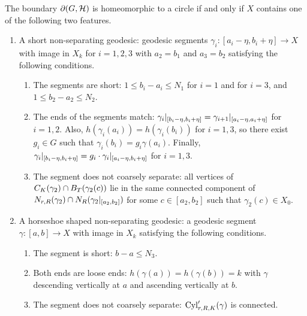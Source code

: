 \begin{theorem}\label{theorem:circular_boundary_feature} 
  The boundary $\partial (G,\mathcal{H})$ is homeomorphic to a circle if and only if $X$ contains one of the following two features.
\begin{enumerate}
  \item 
    A short non-separating geodesic: geodesic segments $\gamma_i \colon [a_i - \eta, b_i + \eta] \to X$ with image in $X_k$ for $i = 1, 2, 3$ with $a_2 = b_1$ and $a_3 = b_2$ satisfying the following conditions.
    \begin{enumerate}
      \item\label{noncutpairshort} The segments are short: $1 \leq b_i - a_i \leq N_1$ for $i = 1$ and for $i = 3$, and $1 \leq b_2 - a_2 \leq N_2$.
      \item\label{noncutpairmatching} 
        The ends of the segments match: $\gamma_i\vert_{[b_i - \eta, b_i + \eta]} = \gamma_{i+1}\vert_{[a_i - \eta, a_i + \eta]}$ for $i = 1, 2$. 
        Also, $h(\gamma_i(a_i)) = h(\gamma_i(b_i))$ for $i = 1, 3$, so there exist $g_i \in G$ such that $\gamma_i(b_i) = g_i\gamma(a_i)$.
        Finally, $\gamma_i\vert_{[b_i - \eta, b_i + \eta]} = g_i \cdot\gamma_i\vert_{[a_i - \eta, b_i + \eta]}$ for $i = 1, 3$.
      \item\label{noncutpairconnected} 
        The segment does not coarsely separate: all vertices of $C_K(\gamma_2) \cap B_{T}(\gamma_2(c))$ lie in the same connected component of $N_{r, R}(\gamma_2) \cap N_R(\gamma_2\vert_{[a_2, b_2]})$ for some $c \in [a_2, b_2]$ such that $\gamma_2(c) \in X_0$.
    \end{enumerate}
  \item A horseshoe shaped non-separating geodesic: a geodesic segment $\gamma \colon [a, b] \to X$ with image in $X_k$ satisfying the following conditions.
  \begin{enumerate}
    \item The segment is short: $b - a \leq N_3$.
    \item Both ends are loose ends: $h(\gamma(a)) = h(\gamma(b)) = k$ with $\gamma$ descending vertically at $a$ and ascending vertically at $b$.
    \item The segment does not coarsely separate: $\operatorname{Cyl}'_{r, R, K}(\gamma)$ is connected.
  \end{enumerate}
\end{enumerate}
\end{theorem}

